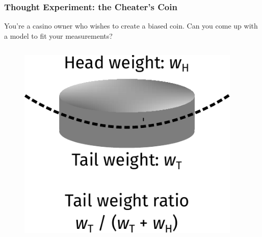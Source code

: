 \documentclass[10pt,aspectratio=169]{beamer}
\begin{document}
\begin{frame}
  \frametitle{Thought Experiment: the Cheater’s Coin}
  
  You're a casino owner who wishes to create a biased coin. Can you
  come up with a model to fit your measurements?

  \vfill
  \begin{columns}
    \begin{column}{0.25\textwidth}
      \begin{figure}[t]
        \centering
        \includegraphics[width=\textwidth]{images/coin.pdf}
      \end{figure}
    \end{column}
    \begin{column}{0.75\textwidth}
    \end{column}
  \end{columns}

\end{frame}
\end{document}
